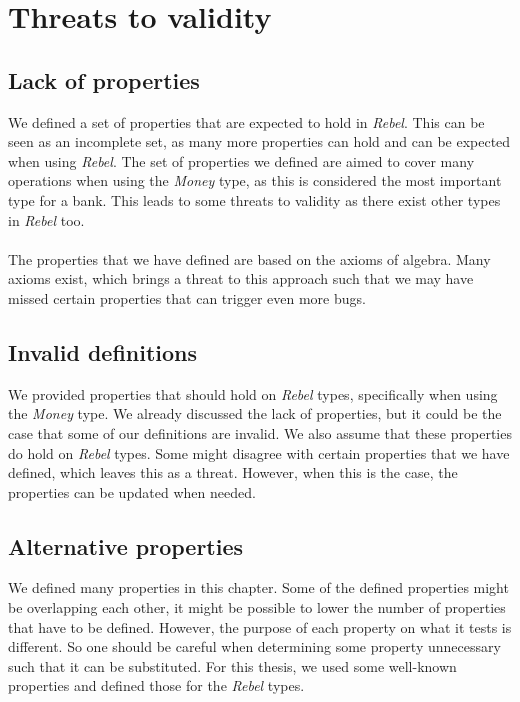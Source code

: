 \section{Threats to validity}
\subsection*{Lack of properties}
We defined a set of properties that are expected to hold in \textit{Rebel}.
This can be seen as an incomplete set, as many more properties can hold and can
be expected when using \textit{Rebel}. The set of properties we defined are
aimed to cover many operations when using the \textit{Money} type, as this is
considered the most important type for a bank. This leads to some threats to
validity as there exist other types in \textit{Rebel} too.\\
\\
The properties that we have defined are based on the axioms of algebra. Many
axioms exist, which brings a threat to this approach such that we may have
missed certain properties that can trigger even more bugs.

\subsection*{Invalid definitions}
We provided properties that should hold on \textit{Rebel} types, specifically
when using the \textit{Money} type. We already discussed the lack of properties,
but it could be the case that some of our definitions are invalid. We also assume that
these properties do hold on \textit{Rebel} types. Some might disagree with
certain properties that we have defined, which leaves this as a threat. However,
when this is the case, the properties can be updated when needed.

\subsection*{Alternative properties}
We defined many properties in this chapter. Some of the defined properties
might be overlapping each other, it might be possible to lower the number of
properties that have to be defined. However, the purpose of each property on
what it tests is different. So one should be careful when determining some
property unnecessary such that it can be substituted. For this thesis, we used
some well-known properties and defined those for the \textit{Rebel} types.
